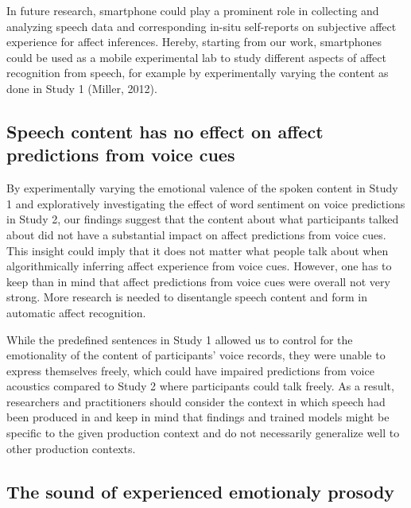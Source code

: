 \documentclass[
  english,
  man,floatsintext]{apa6}
\begin{document}
In future research, smartphone could play a prominent role in collecting and analyzing speech data and corresponding in-situ self-reports on subjective affect experience for affect inferences. Hereby, starting from our work, smartphones could be used as a mobile experimental lab to study different aspects of affect recognition from speech, for example by experimentally varying the content as done in Study 1 (Miller, 2012).

\hypertarget{speech-content-has-no-effect-on-affect-predictions-from-voice-cues}{%
\subsection{Speech content has no effect on affect predictions from voice cues}\label{speech-content-has-no-effect-on-affect-predictions-from-voice-cues}}

By experimentally varying the emotional valence of the spoken content in Study 1 and exploratively investigating the effect of word sentiment on voice predictions in Study 2, our findings suggest that the content about what participants talked about did not have a substantial impact on affect predictions from voice cues. This insight could imply that it does not matter what people talk about when algorithmically inferring affect experience from voice cues. However, one has to keep than in mind that affect predictions from voice cues were overall not very strong. More research is needed to disentangle speech content and form in automatic affect recognition.

While the predefined sentences in Study 1 allowed us to control for the emotionality of the content of participants' voice records, they were unable to express themselves freely, which could have impaired predictions from voice acoustics compared to Study 2 where participants could talk freely. As a result, researchers and practitioners should consider the context in which speech had been produced in and keep in mind that findings and trained models might be specific to the given production context and do not necessarily generalize well to other production contexts.

\hypertarget{the-sound-of-experienced-emotionaly-prosody}{%
\subsection{The sound of experienced emotionaly prosody}\label{the-sound-of-experienced-emotionaly-prosody}}
\end{document}

